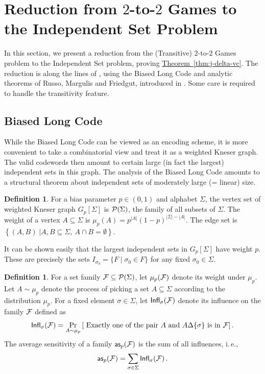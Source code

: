 \documentclass[11pt]{article}
\numberwithin{equation}{section}
\theoremstyle{definition}
\newtheorem{definition}[theorem]{Definition}
\theoremstyle{plain}
\newcommand{\ie}{i.\,e.}
\newcommand{\expref}[2]{\hyperref[#2]{#1~\ref{#2}}}
\newcommand\card[1]{\left| {#1} \right|}
\newcommand\sett[2]{\left\{ \left. #1 \;\right\vert #2 \right\}}
\newcommand\Prob[2]{{\Pr_{#1}\left[ {#2} \right]}}
\begin{document}
\section{Reduction from \texorpdfstring{$2$-to-$2$}{2-to-2} Games
to the Independent Set Problem}\label{sec:vc-is}

In this section, we present a reduction from the (Transitive) $2$-to-$2$ Games problem to the Independent Set problem, proving
\expref{Theorem}{thm:j-delta-vc}.
The reduction is along the lines of \cite{DS05, Khot02, KR08}, using the Biased Long Code
and analytic theorems of Russo, Margulis and Friedgut, introduced in \cite{DS05}. Some care is required to handle the
transitivity feature.


\subsection{Biased Long Code}\label{appendix:blc}
While the Biased Long Code can be viewed as an encoding scheme, it is more convenient to take a combinatorial
view and treat it as a weighted Kneser graph. The valid codewords then amount to certain large (in fact the largest) independent sets
in this graph. The analysis of the Biased Long Code amounts to a structural theorem about independent sets of
moderately large (= linear) size.


\begin{definition} For a bias parameter $p \in (0, 1)$ and alphabet $\Sigma$,
the vertex set of weighted Kneser graph  $G_p[\Sigma]$ is ${\cal P}(\Sigma)$, the family of all subsets of $\Sigma$.
The weight of a vertex $A \subseteq \Sigma$ is $\mu_p(A)=p^{\card{A}}(1-p)^{|\Sigma|-\card{A}}$.
The edge set is $\sett{(A,B)}{A, B \subseteq\Sigma, ~A\cap B=\emptyset}$.
\end{definition}

It can be shown easily that the largest independent sets in $G_p[\Sigma]$ have weight $p$. These are precisely
the sets $I_{\sigma_0} = \{ F \mid \sigma_0 \in F \}$ for any fixed $\sigma_0 \in \Sigma$.

\begin{definition} For a set family ${\cal F} \subseteq {\cal P}(\Sigma)$, let $\mu_p({\cal F})$ denote its
weight under $\mu_p$. Let $A \sim \mu_p$ denote the process of picking a set $A \subseteq \Sigma$
according to the distribution $\mu_p$.
For a fixed element $\sigma \in \Sigma$, let ${\sf Infl}_\sigma({\cal F})$ denote its
influence on the family ${\cal F}$ defined as
 $$ {\sf Infl}_\sigma({\cal F})  =  \Prob{A \sim \mu_p}{\mbox{~Exactly one of the pair} ~A ~\mbox{and}  ~A \Delta \{\sigma\} ~\mbox{is in} ~{\cal F}}\,. $$%
 The average sensitivity of a family ${\sf as}_p({\cal F})$ is the sum of all influences, \ie,
 $${\sf as}_p({\cal F}) = \sum_{\sigma \in \Sigma}  {\sf Infl}_\sigma({\cal F})\,.   $$%
\end{definition}
\end{document}
